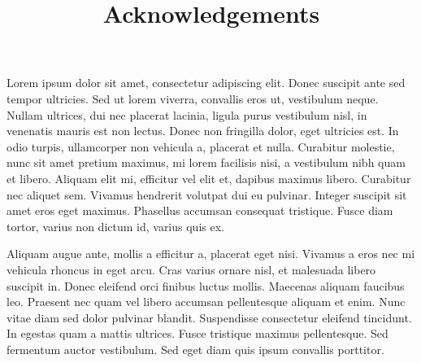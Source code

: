 \documentclass{article}
\begin{document}
\title{Acknowledgements}

\maketitle


Lorem ipsum dolor sit amet, consectetur adipiscing elit. Donec suscipit ante sed tempor ultricies. Sed ut lorem viverra, convallis eros ut, vestibulum neque. Nullam ultrices, dui nec placerat lacinia, ligula purus vestibulum nisl, in venenatis mauris est non lectus. Donec non fringilla dolor, eget ultricies est. In odio turpis, ullamcorper non vehicula a, placerat et nulla. Curabitur molestie, nunc sit amet pretium maximus, mi lorem facilisis nisi, a vestibulum nibh quam et libero. Aliquam elit mi, efficitur vel elit et, dapibus maximus libero. Curabitur nec aliquet sem. Vivamus hendrerit volutpat dui eu pulvinar. Integer suscipit sit amet eros eget maximus. Phasellus accumsan consequat tristique. Fusce diam tortor, varius non dictum id, varius quis ex.


Aliquam augue ante, mollis a efficitur a, placerat eget nisi. Vivamus a eros nec mi vehicula rhoncus in eget arcu. Cras varius ornare nisl, et malesuada libero suscipit in. Donec eleifend orci finibus luctus mollis. Maecenas aliquam faucibus leo. Praesent nec quam vel libero accumsan pellentesque aliquam et enim. Nunc vitae diam sed dolor pulvinar blandit. Suspendisse consectetur eleifend tincidunt. In egestas quam a mattis ultrices. Fusce tristique maximus pellentesque. Sed fermentum auctor vestibulum. Sed eget diam quis ipsum convallis porttitor.
\end{document}
